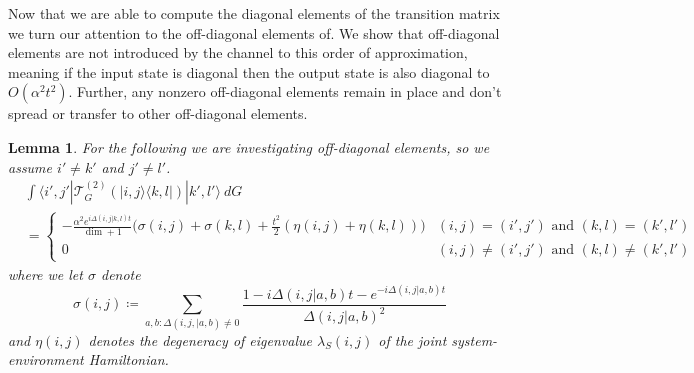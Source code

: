 \documentclass{article}
\newtheorem{lemma}[theorem]{Lemma}
\newcommand{\ket}[1]{|#1\rangle}
\newcommand{\bra}[1]{\langle #1|}
\newcommand{\ketbra}[2]{| #1\rangle\! \langle #2|}
\newcommand{\bigo}[1]{O\left( #1 \right)}
\begin{document}
Now that we are able to compute the diagonal elements of the transition matrix we turn our attention to the off-diagonal elements of. We show that off-diagonal elements are not introduced by the channel to this order of approximation, meaning if the input state is diagonal then the output state is also diagonal to $\bigo{\alpha^2 t^2}$. Further, any nonzero off-diagonal elements remain in place and don't spread or transfer to other off-diagonal elements. 
\begin{lemma} \label{lem:off_diagonal_elems}
     For the following we are investigating off-diagonal elements, so we assume $i' \neq k'$ and $j' \neq l'$.
    \begin{align}
    &\int \bra{i', j'}  \mathcal{T}^{(2)}_G \left( \ketbra{i, j}{k, l} \right) \ket{k', l'} ~dG \\
    &=\begin{cases}
        -\frac{\alpha^2 e^{i \Delta(i,j|k,l) t}}{\dim + 1} \bigg( \sigma(i,j) + \sigma(k,l) + \frac{t^2}{2}(\eta(i,j) + \eta(k,l)) \bigg) & (i, j) = (i', j') \text{ and } (k, l) = (k', l') \\
        0 & (i, j) \neq (i', j') \text{ and } (k, l) \neq (k', l')
    \end{cases}
    \end{align}
    where we let $\sigma$ denote
    \begin{equation}
        \sigma(i,j) \coloneqq \sum_{a,b: \Delta(i,j,|a,b) \neq 0} \frac{1 - i \Delta(i,j|a,b)t - e^{-i \Delta(i,j|a,b) t}}{\Delta(i,j|a,b)^2}
    \end{equation}
    and $\eta(i,j)$ denotes the degeneracy of eigenvalue $\lambda_S(i,j)$ of the joint system-environment Hamiltonian. 
\end{lemma}
\end{document}
